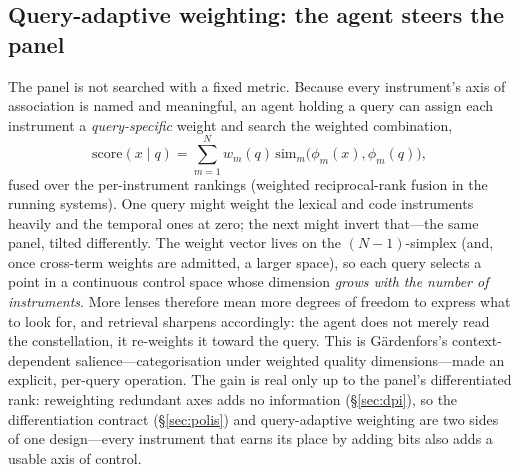 \documentclass[10pt,twocolumn]{article}
\begin{document}
\subsection{Query-adaptive weighting: the agent steers the panel}
\label{sec:weighting}
The panel is not searched with a fixed metric. Because every instrument's axis of
association is named and meaningful, an agent holding a query can assign each
instrument a \emph{query-specific} weight and search the weighted combination,
\begin{equation}
\mathrm{score}(x\mid q) = \sum_{m=1}^{N} w_m(q)\,\mathrm{sim}_m\bigl(\phi_m(x),\phi_m(q)\bigr),
\tag{6}
\end{equation}
fused over the per-instrument rankings (weighted reciprocal-rank fusion in the
running systems). One query might weight the lexical and code instruments heavily
and the temporal ones at zero; the next might invert that---the same panel, tilted
differently. The weight vector lives on the $(N{-}1)$-simplex (and, once cross-term
weights are admitted, a larger space), so each query selects a point in a
continuous control space whose dimension \emph{grows with the number of
instruments}. More lenses therefore mean more degrees of freedom to express what
to look for, and retrieval sharpens accordingly: the agent does not merely read the
constellation, it re-weights it toward the query. This is Gärdenfors's
context-dependent salience---categorisation under weighted quality
dimensions---made an explicit, per-query operation. The gain is real only up to the
panel's differentiated rank: reweighting redundant axes adds no information
(\S\ref{sec:dpi}), so the differentiation contract (\S\ref{sec:polis}) and
query-adaptive weighting are two sides of one design---every instrument that earns
its place by adding bits also adds a usable axis of control.
\end{document}

